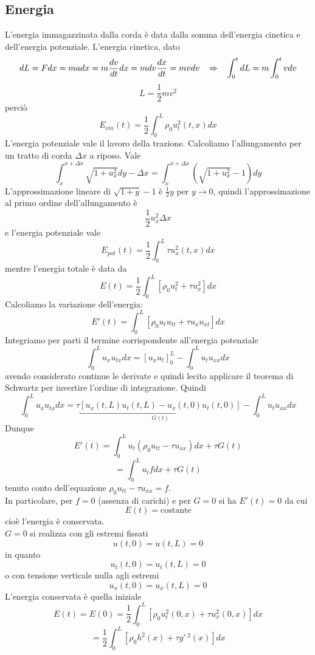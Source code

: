 \subsection{Energia}
L'energia immagazzinata dalla corda \`e data dalla somma dell'energia cinetica
e dell'energia potenziale. L'energia cinetica, dato
\[
	dL=Fdx=madx=m\frac{dv}{dt}dx=mdv\frac{dx}{dt}=mvdv
	\;\;\; \Rightarrow \;\;\;
	\int_0^t dL= m \int_0^t vdv
\]
\[
	L=\frac{1}{2}mv^2
\]
perci\`o
\[
	E_{cin}(t)= \frac{1}{2}\int_0^L \rho_0 u^2_t(t,x)dx
\]
L'energia potenziale vale il lavoro della trazione.
Calcoliamo l'allungamento per un tratto di corda $\Delta x$ a riposo. Vale
\[
	\int_x^{x + \Delta x} \sqrt{1+ u^2_x} dy - \Delta x=
	\int_x^{x + \Delta x} \left( \sqrt{1+ u^2_x}-1 \right) dy
\]
L'approssimazione lineare di $\sqrt{1+y}-1$ \`e $\frac{1}{2}y$ per $y \to 0$,
quindi l'approssimazione al primo ordine dell'allungamento \`e
\[
	\frac{1}{2} u^2_x \Delta x
\]
e l'energia potenziale vale
\[
	E_{pot}(t)= \frac{1}{2} \int_0^L \tau u^2_x (t,x)dx
\]
mentre l'energia totale \`e data da
\[
	E(t)= \frac{1}{2}\int_0^L \left[
	\rho_0 u^2_t + \tau u_x^2
	\right] dx
\]
Calcoliamo la variazione dell'energia:
\[
	E'(t)= \int_0^L \left[
	\rho_0 u_t u_{tt} + \tau u_x u_{xt}
	\right] dx
\]
Integriamo per parti il termine corrispondente all'energia potenziale
\[
	\int_0^L u_x u_{tx}dx=
	\left[ u_x u_t \right]_0^L -
	\int_0^L u_t u_{xx} dx
\]
avendo considerato continue le derivate e quindi lecito applicare il
teorema di Schwartz per invertire l'ordine di integrazione. Quindi
\[
	\int_0^L u_x u_{tx}dx=
	\tau \underbracket{\left[ u_x(t,L) u_t(t,L) -  u_x(t,0) u_t(t,0)
\right]}_{
	G(t)} -
	\int_0^L u_t u_{xx} dx
\]
Dunque
\[
	E'(t)= \int_0^L u_t (\rho_0 u_{tt} - \tau u_{xx})dx + \tau G(t)
\]
\[
	= \int_0^L u_t f dx + \tau G(t)
\]
tenuto conto dell'equazione $\rho_0 u_{tt} - \tau u_{xx}= f$.\\
In particolare, per $f=0$ (assenza di carichi) e per $G=0$ si ha $E'(t)=0$
da cui
\[
	E(t)= \text{costante}
\]
cio\`e l'energia \`e conservata.\\
$G=0$ si realizza con gli estremi fissati
\[
	u(t,0)=u(t,L)=0
\]
in quanto
\[
	u_t(t,0)=u_t(t,L)=0
\]
o con tensione verticale nulla agli estremi
\[
	u_x(t,0)=u_x(t,L)=0
\]
L'energia conservata \`e quella iniziale
\[
	E(t)=E(0)=\frac{1}{2}\int_0^L
	\left[
	\rho_0 u_t^2 (0,x) + \tau u^2_x (0,x)
	\right]dx
\]
\[
	=\frac{1}{2}\int_0^L
	\left[
	\rho_0 h^2(x) + \tau g'\,^2(x)
	\right]dx
\]
